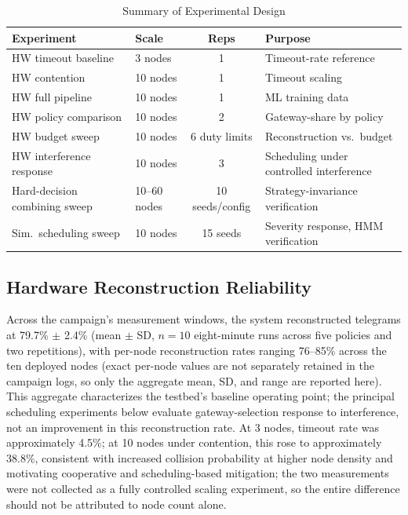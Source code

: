 \documentclass[journal]{IEEEtran}
\begin{document}
\begin{table}[t]
\caption{Summary of Experimental Design}
\label{tab:exp_design}
\centering
\footnotesize
\begin{tabular}{|p{2.0cm}|p{1.5cm}|c|p{2.2cm}|}
\hline
\textbf{Experiment} & \textbf{Scale} & \textbf{Reps} & \textbf{Purpose} \\
\hline
HW timeout baseline & 3 nodes & 1 & Timeout-rate reference \\
\hline
HW contention & 10 nodes & 1 & Timeout scaling \\
\hline
HW full pipeline & 10 nodes & 1 & ML training data \\
\hline
HW policy comparison & 10 nodes & 2 & Gateway-share by policy \\
\hline
HW budget sweep & 10 nodes & 6 duty limits & Reconstruction vs.\ budget \\
\hline
HW interference response & 10 nodes & 3 & Scheduling under controlled interference \\
\hline
Hard-decision combining sweep & 10--60 nodes & 10 seeds/config & Strategy-invariance verification \\
\hline
Sim.\ scheduling sweep & 10 nodes & 15 seeds & Severity response, HMM verification \\
\hline
\end{tabular}
\end{table}

\subsection{Hardware Reconstruction Reliability}
Across the campaign's measurement windows, the system reconstructed telegrams at 79.7\% $\pm$ 2.4\% (mean $\pm$ SD, $n=10$ eight-minute runs across five policies and two repetitions), with per-node reconstruction rates ranging 76--85\% across the ten deployed nodes (exact per-node values are not separately retained in the campaign logs, so only the aggregate mean, SD, and range are reported here). This aggregate characterizes the testbed's baseline operating point; the principal scheduling experiments below evaluate gateway-selection response to interference, not an improvement in this reconstruction rate. At 3 nodes, timeout rate was approximately 4.5\%; at 10 nodes under contention, this rose to approximately 38.8\%, consistent with increased collision probability at higher node density and motivating cooperative and scheduling-based mitigation; the two measurements were not collected as a fully controlled scaling experiment, so the entire difference should not be attributed to node count alone.
\end{document}
